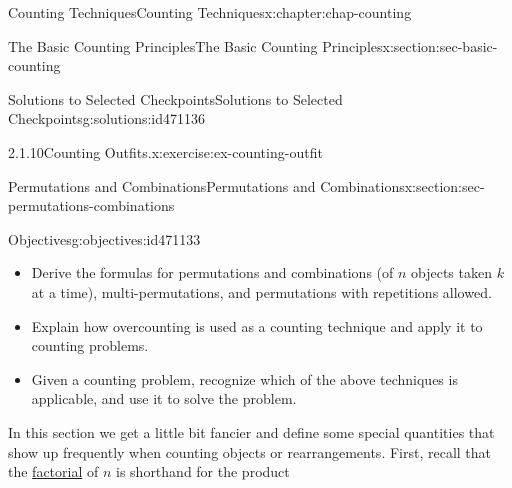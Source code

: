 \documentclass[oneside,10pt,]{book}
\newcommand{\blocktitlefont}{\relax}
\newcommand{\xreffont}{\relax}
\numberwithin{equation}{section}
\begin{document}
\begin{chapterptx}{Counting Techniques}{}{Counting Techniques}{}{}{x:chapter:chap-counting}
\begin{sectionptx}{The Basic Counting Principles}{}{The Basic Counting Principles}{}{}{x:section:sec-basic-counting}
\begin{solutions-subsection}{Solutions to Selected Checkpoints}{}{Solutions to Selected Checkpoints}{}{}{g:solutions:id471136}
\begin{inlineexercisesolution}{2.1.10}{Counting Outfits.}{x:exercise:ex-counting-outfit}
\begin{sidebyside}{1}{0.15}{0.15}{0}
\begin{sbspanel}{0.7}
{}%
\end{sbspanel}%
\end{sidebyside}%
\end{inlineexercisesolution}
\end{solutions-subsection}
\end{sectionptx}
%
%
\typeout{************************************************}
\typeout{************************************************}
%
\begin{sectionptx}{Permutations and Combinations}{}{Permutations and Combinations}{}{}{x:section:sec-permutations-combinations}
\begin{objectives}{Objectives}{g:objectives:id471133}
%
\begin{itemize}[label=\textbullet]
\item{}Derive the formulas for permutations and combinations (of \(n\) objects taken \(k\) at a time), multi-permutations, and permutations with repetitions allowed.%
\item{}Explain how overcounting is used as a counting technique and apply it to counting problems.%
\item{}Given a counting problem, recognize which of the above techniques is applicable, and use it to solve the problem.%
\end{itemize}
\end{objectives}
In this section we get a little bit fancier and define some special quantities that show up frequently when counting objects or rearrangements. First, recall that the \hyperref[x:definition:def-factorial]{factorial} of \(n\) is shorthand for the product%

\end{sectionptx}
\end{chapterptx}
\end{document}
